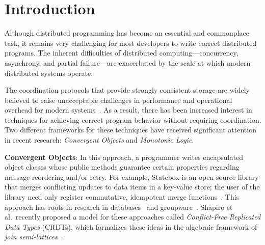 \section{Introduction} 
\label{sec:intro} 
Although distributed programming has become an essential and commonplace task,
it remains very challenging for most developers to write correct distributed
programs. The inherent difficulties of distributed computing---concurrency,
asynchrony, and partial failure---are exacerbated by the scale at which modern
distributed systems operate.

The coordination protocols that provide strongly consistent storage are widely believed to raise unacceptable challenges in performance and operational overhead for modern systems~\cite{Birman2009}. As a result, 
there has been increased interest in techniques for achieving correct program behavior without requiring coordination. 
Two different frameworks for these techniques have received significant attention in recent research:
\emph{Convergent Objects} and \emph{Monotonic Logic}.  

\vspace{0.5em}\noindent
\textbf{Convergent Objects}: In this approach, a programmer writes encapsulated
object classes whose public methods guarantee certain properties regarding
message reordering and/or retry. For example, Statebox is an open-source library
that merges conflicting updates to data items in a key-value store; the user of
the library need only register commutative, idempotent merge
functions~\cite{statebox}. This approach has roots in research in
databases~\cite{Farrag1989,Garcia-Molina1983,Helland2009} and
groupware~\cite{Ellis1989,Sun1998}.  Shapiro et al.\ recently proposed a model
for these approaches called \emph{Conflict-Free Replicated Data Types} (CRDTs),
which formalizes these ideas in the algebraic framework of {\em join semi-lattices}~\cite{Shapiro2011b}.

